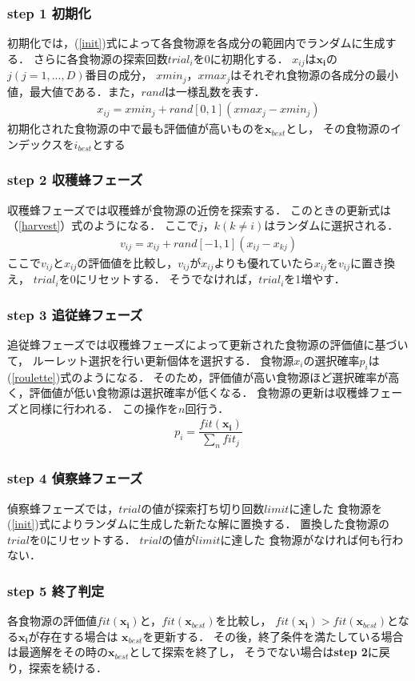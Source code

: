 \subsubsection*{step 1 初期化}
初期化では，(\ref{init})式によって各食物源を各成分の範囲内でランダムに生成する．
さらに各食物源の探索回数$trial_i$を0に初期化する．
$x_{ij}$は$\boldsymbol{x_{i}}$の$j(j=1,...,D)$番目の成分， 
$xmin_j$，$xmax_j$はそれぞれ食物源の各成分の最小値，最大値である．また，$rand$は一様乱数を表す． 
\begin{align}
    x_{ij} = xmin_j + rand[0,1](xmax_j-xmin_j)\label{init}
\end{align}
初期化された食物源の中で最も評価値が高いものを$\boldsymbol{x}_{best}$とし，
その食物源のインデックスを$i_{best}$とする
\subsubsection*{step 2 収穫蜂フェーズ}
収穫蜂フェーズでは収穫蜂が食物源の近傍を探索する．
このときの更新式は（\ref{harvest}）式のようになる．
ここで$j，k(k\neq i)$はランダムに選択される．
\begin{align}
v_{ij} = x_{ij} + rand[-1,1](x_{ij}-x_{kj})\label{harvest}
\end{align}
ここで$v_{ij}$と$x_{ij}$の評価値を比較し，$v_{ij}$が$x_{ij}$よりも優れていたら$x_{ij}$を$v_{ij}$に置き換え，
$trial_i$を0にリセットする．
そうでなければ，$trial_i$を1増やす．
\subsubsection*{step 3 追従蜂フェーズ}
追従蜂フェーズでは収穫蜂フェーズによって更新された食物源の評価値に基づいて，
ルーレット選択を行い更新個体を選択する．
食物源$x_i$の選択確率$p_i$は(\ref{roulette})式のようになる．
そのため，評価値が高い食物源ほど選択確率が高く，評価値が低い食物源は選択確率が低くなる．
食物源の更新は収穫蜂フェーズと同様に行われる．
この操作を$n$回行う．
\begin{align}
    p_i = \dfrac{fit(\boldsymbol{x_{i}})}{\sum_{n}fit_j}\label{roulette}
\end{align}
\subsubsection*{step 4 偵察蜂フェーズ}
偵察蜂フェーズでは，$trial$の値が探索打ち切り回数$limit$に達した
食物源を(\ref{init})式によりランダムに生成した新たな解に置換する． 
置換した食物源の$trial$を0にリセットする．
$trial$の値が$limit$に達した
食物源がなければ何も行わない．
\subsubsection*{step 5 終了判定}
各食物源の評価値$fit(\boldsymbol{x_{i}})$と，$fit(\boldsymbol{x}_{best})$を比較し，
$fit(\boldsymbol{x_{i}}) > fit(\boldsymbol{x}_{best})$となる$\boldsymbol{x_{i}}$が存在する場合は
$\boldsymbol{x}_{best}$を更新する．
その後，終了条件を満たしている場合は最適解をその時の$\boldsymbol{x}_{best}$として探索を終了し，
そうでない場合は\textbf{step 2}に戻り，探索を続ける．
